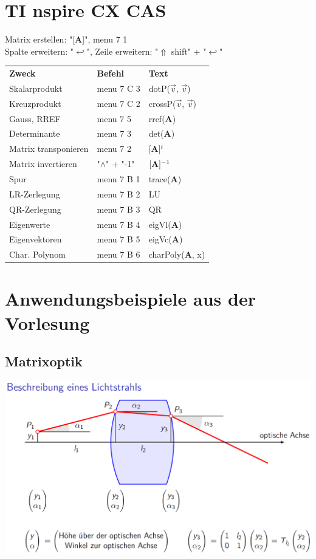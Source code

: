     
\section{TI nspire CX CAS}
	Matrix erstellen: "[\textbf{A}]", menu 7 1\\
	Spalte erweitern: "$\hookleftarrow$",  Zeile erweitern: "$\Uparrow$ shift" + "$\hookleftarrow$" \\
	\begin{tabular}{lll}
		\textbf{Zweck} & \textbf{Befehl} & \textbf{Text}\\
		Skalarprodukt & menu 7 C 3 & dotP($\vec{v}$, $\vec{v}$) \\
		Kreuzprodukt  & menu 7 C 2 & crossP($\vec{v}$, $\vec{v}$) \\
		Gauss, RREF & menu 7 5 & rref(\textbf{A}) \\
		Determinante & menu 7 3 & det(\textbf{A}) \\
		Matrix transponieren &  menu 7 2 & [\textbf{A}]$^t$\\
		Matrix invertieren & "$\wedge$" + "-1" & $[\text{\textbf{A}}]^{-1}$ \\
		Spur & menu 7 B 1 & trace(\textbf{A})\\
		LR-Zerlegung & menu 7 B 2 & LU \\
		QR-Zerlegung & menu 7 B 3 & QR \\
		Eigenwerte & menu 7 B 4 & eigVl(\textbf{A})\\
		Eigenvektoren & menu 7 B 5 & eigVc(\textbf{A}) \\
		Char. Polynom & menu 7 B 6 & charPoly(\textbf{A}, x) \\
	\end{tabular}
 
\section{Anwendungsbeispiele aus der Vorlesung}
		 
	\subsection{Matrixoptik}
		 
		 \includegraphics[width=0.85\linewidth]{Bilder/matrixoptik1} \\
		 
